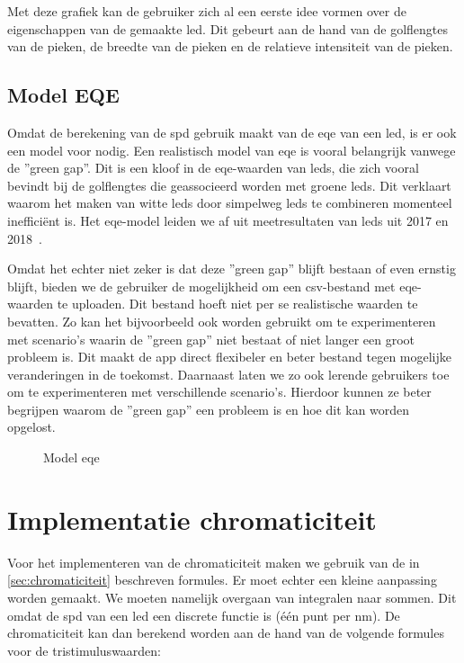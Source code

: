 Met deze grafiek kan de gebruiker zich al een eerste idee vormen over de eigenschappen van de gemaakte \gls{led}. Dit gebeurt aan de hand van de golflengtes van de pieken, de breedte van de pieken en de relatieve intensiteit van de pieken.

\subsection{Model EQE}\label{sec:eqe}

Omdat de berekening van de \gls{spd} gebruik maakt van de \gls{eqe} van een \gls{led}, is er ook een model voor nodig. Een realistisch model van \gls{eqe} is vooral belangrijk vanwege de ''green gap''. Dit is een kloof in de \gls{eqe}-waarden van \gls{led}s, die zich vooral bevindt bij de golflengtes die geassocieerd worden met groene \gls{led}s. Dit verklaart waarom het maken van witte \gls{led}s door simpelweg \gls{led}s te combineren momenteel ineffici\"ent is. Het \gls{eqe}-model leiden we af uit meetresultaten van \gls{led}s uit 2017 en 2018~\cite{hahnClosingGreenGapb}.  

Omdat het echter niet zeker is dat deze ''green gap'' blijft bestaan of even ernstig blijft, bieden we de gebruiker de mogelijkheid om een \gls{csv}-bestand met \gls{eqe}-waarden te uploaden. Dit bestand hoeft niet per se realistische waarden te bevatten. Zo kan het bijvoorbeeld ook worden gebruikt om te experimenteren met scenario's waarin de ''green gap'' niet bestaat of niet langer een groot probleem is. Dit maakt de app direct flexibeler en beter bestand tegen mogelijke veranderingen in de toekomst. Daarnaast laten we zo ook lerende gebruikers toe om te experimenteren met verschillende scenario's. Hierdoor kunnen ze beter begrijpen waarom de ''green gap'' een probleem is en hoe dit kan worden opgelost.

\begin{figure}[H]
    \centering
    \resizebox{0.7\textwidth}{!}{}
    \caption{Model \gls{eqe} ~\cite{hahnClosingGreenGapb}}
    \label{fig:eqe}
\end{figure}

\section{Implementatie chromaticiteit}

Voor het implementeren van de chromaticiteit maken we gebruik van de in \cref{sec:chromaticiteit} beschreven formules. Er moet echter een kleine aanpassing worden gemaakt. We moeten namelijk overgaan van integralen naar sommen. Dit omdat de \gls{spd} van een \gls{led} een discrete functie is (\'e\'en punt per nm). De chromaticiteit kan dan berekend worden aan de hand van de volgende formules voor de tristimuluswaarden:

